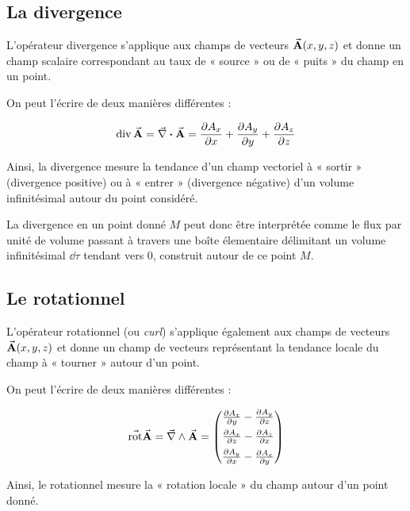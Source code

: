\documentclass[a4paper,12pt]{article}
\newcommand{\Nabla}{\va{\nabla}}
\renewcommand{\curl}{\Nabla \wedge}
\newcommand{\rot}{\va{\operatorname{rot}}}
\renewcommand{\div}{\operatorname{div}}
\begin{document}
        \clearpage

        \subsection{La divergence}

            L'opérateur divergence s'applique aux champs de vecteurs 
            $ \va{A}(x, y, z) $ et donne un champ scalaire correspondant au taux de « source » ou de « puits » du champ en un point.

            On peut l'écrire de deux manières différentes :

            \[
            \div{\va{A}} = \Nabla \vdot \va{A} 
            = \pdv{A_x}{x} + \pdv{A_y}{y} + \pdv{A_z}{z}
            \]

            Ainsi, la divergence mesure la tendance d'un champ vectoriel à « sortir » (divergence positive) 
            ou à « entrer » (divergence négative) d'un volume infinitésimal autour du point considéré.
            
            La divergence en un point donné $M$ peut donc être interprétée comme le flux par unité
            de volume passant à travers une boîte élementaire délimitant un volume infinitésimal $ \dd \tau $
            tendant vers 0, construit autour de ce point $M$.


        \subsection{Le rotationnel}

            L'opérateur rotationnel (ou \emph{curl}) s'applique également aux champs de vecteurs 
            $ \va{A}(x, y, z) $ et donne un champ de vecteurs représentant la tendance locale 
            du champ à « tourner » autour d'un point.

            On peut l'écrire de deux manières différentes :

            $$ \rot \va{A} = \curl \va{A} =
                \begin{pmatrix}
                    \pdv{A_z}{y} - \pdv{A_y}{z} \\[0.5em]
                    \pdv{A_x}{z} - \pdv{A_z}{x} \\[0.5em]
                    \pdv{A_y}{x} - \pdv{A_x}{y}
                \end{pmatrix} $$

            Ainsi, le rotationnel mesure la « rotation locale » du champ autour d'un point donné.
\end{document}
